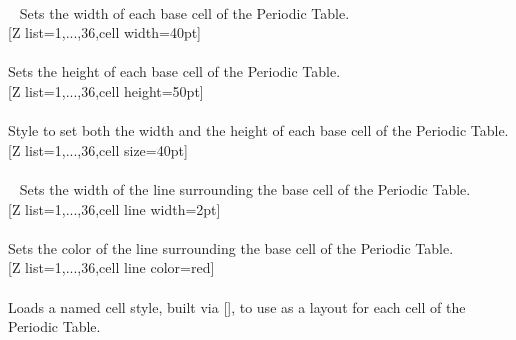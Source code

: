\\ [-5pt]\pgfPTendoption%
\newpage\vspace{-34pt}\ %
\label{option_cell width}%
%
{Sets the width of each base cell of the Periodic Table.}%
\\ [5pt][Z list={1,...,36},cell width=40pt]%
\\ [10pt]\makebox[\linewidth][c]{\scalebox{.6}{\pgfPT[Z list={1,...,36},cell width=40pt]}}%
\\ [5pt]\pgfPTendoption%
\label{option_cell height}%
%
{Sets the height of each base cell of the Periodic Table.}%
\\ [5pt][Z list={1,...,36},cell height=50pt]%
\\ [10pt]\makebox[\linewidth][c]{\scalebox{.6}{\pgfPT[Z list={1,...,36},cell height=50pt]}}%
\\ [5pt]\pgfPTendoption%
\label{style_cell size}%
%
{Style to set both the width and the height of each base cell of the Periodic Table.}%
\\ [5pt][Z list={1,...,36},cell size=40pt]%
\\ [10pt]\makebox[\linewidth][c]{\scalebox{.6}{\pgfPT[Z list={1,...,36},cell size=40pt]}}%
\\ [5pt]\pgfPTendstyle%
\newpage\vspace{-34pt}\ %
\label{option_cell line width}%
%
{Sets the width of the line surrounding the base cell of the Periodic Table.}%
\\ [5pt][Z list={1,...,36},cell line width=2pt]%
\\ [10pt]\makebox[\linewidth][c]{\scalebox{.6}{\pgfPT[Z list={1,...,36},cell line width=2pt]}}%
\\ [5pt]\pgfPTendoption%
\label{option_cell line color}%
%
{Sets the color of the line surrounding the base cell of the Periodic Table.}%
\\ [5pt][Z list={1,...,36},cell line color=red]%
\\ [10pt]\makebox[\linewidth][c]{\scalebox{.6}{\pgfPT[Z list={1,...,36},cell line color=red]}}%
\\ [5pt]\pgfPTendoption%
\label{option_cell style}%
%
{Loads a named cell style, built via [], to use as a layout for each cell of the Periodic Table.}%
